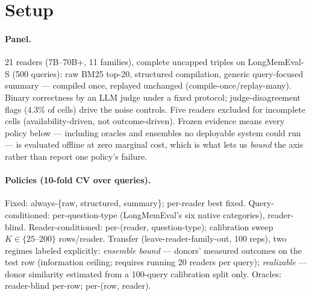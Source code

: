 \section{Setup}
\label{sec:setup}

\paragraph{Panel.} 21 readers (7B--70B+, 11 families), complete uncapped triples
on LongMemEval-S (500 queries): raw BM25 top-20, structured compilation, generic
query-focused summary --- compiled once, replayed unchanged
(compile-once/replay-many). Binary correctness by an LLM judge under a fixed
protocol; judge-disagreement flags (4.3\% of cells) drive the noise controls.
Five readers excluded for incomplete cells (availability-driven, not
outcome-driven). Frozen evidence means every policy below --- including oracles
and ensembles no deployable system could run --- is evaluated offline at zero
marginal cost, which is what lets us \emph{bound} the axis rather than report one
policy's failure.

\paragraph{Policies (10-fold CV over queries).} Fixed: always-\{raw, structured,
summary\}; per-reader best fixed. Query-conditioned: per-question-type
(LongMemEval's six native categories), reader-blind. Reader-conditioned:
per-(reader, question-type); calibration sweep $K \in \{25\text{--}200\}$
rows/reader. Transfer (leave-reader-family-out, 100 reps), two regimes labeled
explicitly: \emph{ensemble bound} --- donors' measured outcomes on the test row
(information ceiling; requires running 20 readers per query);
\emph{realizable} --- donor similarity estimated from a 100-query calibration
split only. Oracles: reader-blind per-row; per-(row, reader).
